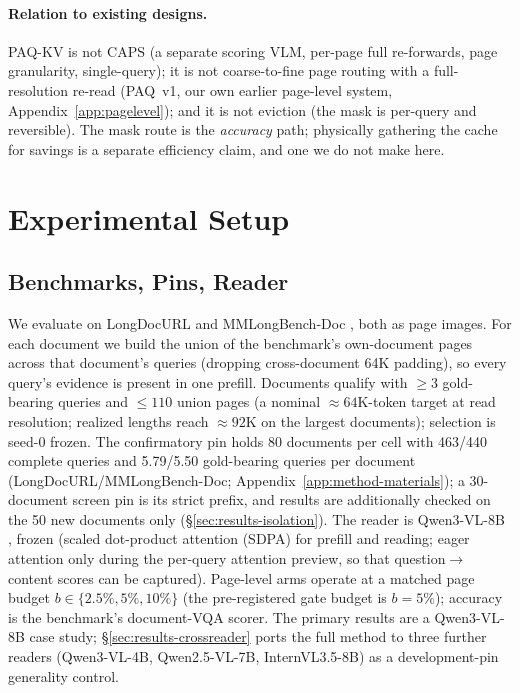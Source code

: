 \documentclass[letterpaper]{article} %
\newcommand{\paq}{\textsc{PAQ}}
\newcommand{\paqc}{\textsc{PAQ-KV}}
\begin{document}
\paragraph{Relation to existing designs.} \paqc{} is not CAPS (a separate scoring VLM, per-page full re-forwards, page granularity, single-query); it is not coarse-to-fine page routing with a full-resolution re-read (\paq{}~v1, our own earlier page-level system, Appendix~\ref{app:pagelevel}); and it is not eviction (the mask is per-query and reversible). The mask route is the \emph{accuracy} path; physically gathering the cache for savings is a separate efficiency claim, and one we do not make here.

\section{Experimental Setup}\label{sec:setup}

\subsection{Benchmarks, Pins, Reader}
We evaluate on LongDocURL \citep{deng2025longdocurl} and MMLongBench-Doc \citep{ma2024mmlongbench}, both as page images. For each document we build the union of the benchmark's own-document pages across that document's queries (dropping cross-document 64K padding), so every query's evidence is present in one prefill. Documents qualify with $\geq 3$ gold-bearing queries and $\leq 110$ union pages (a nominal ${\approx}64$K-token target at read resolution; realized lengths reach ${\approx}92$K on the largest documents); selection is seed-0 frozen. The confirmatory pin holds 80 documents per cell with 463/440 complete queries and 5.79/5.50 gold-bearing queries per document (LongDocURL/MMLongBench-Doc; Appendix~\ref{app:method-materials}); a 30-document screen pin is its strict prefix, and results are additionally checked on the 50 new documents only (\S\ref{sec:results-isolation}). The reader is Qwen3-VL-8B \citep{qwen3vl2025}, frozen (scaled dot-product attention (SDPA) for prefill and reading; eager attention only during the per-query attention preview, so that question$\to$content scores can be captured). Page-level arms operate at a matched page budget $b \in \{2.5\%, 5\%, 10\%\}$ (the pre-registered gate budget is $b=5\%$); accuracy is the benchmark's document-VQA scorer. The primary results are a Qwen3-VL-8B case study; \S\ref{sec:results-crossreader} ports the full method to three further readers (Qwen3-VL-4B, Qwen2.5-VL-7B, InternVL3.5-8B) as a development-pin generality control.
\end{document}
